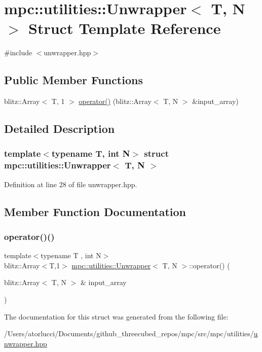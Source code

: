 \hypertarget{structmpc_1_1utilities_1_1_unwrapper}{}\section{mpc\+:\+:utilities\+:\+:Unwrapper$<$ T, N $>$ Struct Template Reference}
\label{structmpc_1_1utilities_1_1_unwrapper}


{\ttfamily \#include $<$unwrapper.\+hpp$>$}

\subsection*{Public Member Functions}
\begin{DoxyCompactItemize}
\item 
blitz\+::\+Array$<$ T, 1 $>$ \mbox{\hyperlink{structmpc_1_1utilities_1_1_unwrapper_a6e18b48b2079334320123322888c0785}{operator()}} (blitz\+::\+Array$<$ T, N $>$ \&input\+\_\+array)
\end{DoxyCompactItemize}


\subsection{Detailed Description}
\subsubsection*{template$<$typename T, int N$>$\newline
struct mpc\+::utilities\+::\+Unwrapper$<$ T, N $>$}



Definition at line 28 of file unwrapper.\+hpp.



\subsection{Member Function Documentation}
\mbox{\label{structmpc_1_1utilities_1_1_unwrapper_a6e18b48b2079334320123322888c0785}} 
\subsubsection{\texorpdfstring{operator()()}{operator()()}}
{\footnotesize\ttfamily template$<$typename T , int N$>$ \\
blitz\+::\+Array$<$T,1$>$ \mbox{\hyperlink{structmpc_1_1utilities_1_1_unwrapper}{mpc\+::utilities\+::\+Unwrapper}}$<$ T, N $>$\+::operator() (\begin{DoxyParamCaption}\item[{blitz\+::\+Array$<$ T, N $>$ \&}]{input\+\_\+array }\end{DoxyParamCaption})}



The documentation for this struct was generated from the following file\+:\begin{DoxyCompactItemize}
\item 
/\+Users/atorlucci/\+Documents/github\+\_\+threecubed\+\_\+repos/mpc/src/mpc/utilities/\mbox{\hyperlink{unwrapper_8hpp}{unwrapper.\+hpp}}\end{DoxyCompactItemize}
